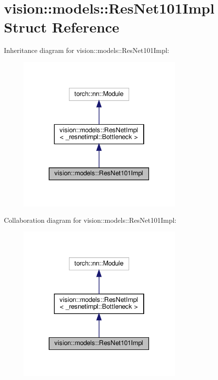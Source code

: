 \hypertarget{structvision_1_1models_1_1ResNet101Impl}{}\section{vision\+:\+:models\+:\+:Res\+Net101\+Impl Struct Reference}
\label{structvision_1_1models_1_1ResNet101Impl}


Inheritance diagram for vision\+:\+:models\+:\+:Res\+Net101\+Impl\+:
\nopagebreak
\begin{figure}[H]
\begin{center}
\leavevmode
\includegraphics[width=234pt]{structvision_1_1models_1_1ResNet101Impl__inherit__graph}
\end{center}
\end{figure}


Collaboration diagram for vision\+:\+:models\+:\+:Res\+Net101\+Impl\+:
\nopagebreak
\begin{figure}[H]
\begin{center}
\leavevmode
\includegraphics[width=234pt]{structvision_1_1models_1_1ResNet101Impl__coll__graph}
\end{center}
\end{figure}
